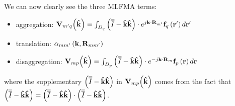 We can now clearly see the three MLFMA terms:
\begin{itemize}
\item aggregation: $\mathbf{V}_{m'q} \! \left(\mathbf{\hat{k}}\right) = \int_{D_q} \left( \overline{\overline{I}}-\mathbf{\hat{k}}\mathbf{\hat{k}} \right) \cdot e^{j\mathbf{k} \cdot \mathbf{R}_{m'}} \mathbf{f}_q\left(\mathbf{r}'\right) d \mathbf{r}'$
\item translation: $\alpha_{mm'}\left(\mathbf{k}, \mathbf{R}_{mm'} \right)$
\item disaggregation: $\mathbf{V}_{mp} \! \left(\mathbf{\hat{k}}\right) = \int_{D_p} \left( \overline{\overline{I}}-\mathbf{\hat{k}}\mathbf{\hat{k}} \right) \cdot e^{-j\mathbf{k} \cdot \mathbf{R}_{m}} \mathbf{f}_p\left(\mathbf{r}\right) d \mathbf{r}$
\end{itemize}
where the supplementary $\left(\overline{\overline{I}}-\mathbf{\hat{k}}\mathbf{\hat{k}} \right)$ in $\mathbf{V}_{mp} \! \left(\mathbf{\hat{k}}\right)$ comes from the fact that $\left(\overline{\overline{I}}-\mathbf{\hat{k}}\mathbf{\hat{k}} \right) = \left(\overline{\overline{I}}-\mathbf{\hat{k}}\mathbf{\hat{k}} \right) \cdot \left(\overline{\overline{I}}-\mathbf{\hat{k}}\mathbf{\hat{k}} \right)$.

